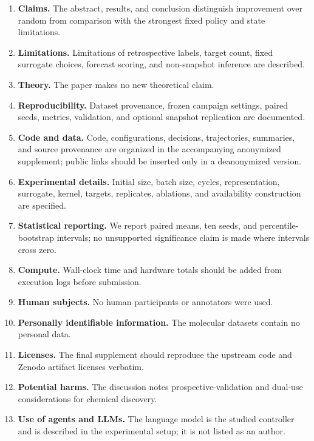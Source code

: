 \documentclass{article}
\begin{document}
\begin{enumerate}[leftmargin=*]
    \item \textbf{Claims.} \answerYes{} The abstract, results, and conclusion distinguish improvement over random from comparison with the strongest fixed policy and state limitations.
    \item \textbf{Limitations.} \answerYes{} Limitations of retrospective labels, target count, fixed surrogate choices, forecast scoring, and non-snapshot inference are described.
    \item \textbf{Theory.} \answerNA{} The paper makes no new theoretical claim.
    \item \textbf{Reproducibility.} \answerYes{} Dataset provenance, frozen campaign settings, paired seeds, metrics, validation, and optional snapshot replication are documented.
    \item \textbf{Code and data.} \answerYes{} Code, configurations, decisions, trajectories, summaries, and source provenance are organized in the accompanying anonymized supplement; public links should be inserted only in a deanonymized version.
    \item \textbf{Experimental details.} \answerYes{} Initial size, batch size, cycles, representation, surrogate, kernel, targets, replicates, ablations, and availability construction are specified.
    \item \textbf{Statistical reporting.} \answerYes{} We report paired means, ten seeds, and percentile-bootstrap intervals; no unsupported significance claim is made where intervals cross zero.
    \item \textbf{Compute.} \answerTODO{} Wall-clock time and hardware totals should be added from execution logs before submission.
    \item \textbf{Human subjects.} \answerNA{} No human participants or annotators were used.
    \item \textbf{Personally identifiable information.} \answerNA{} The molecular datasets contain no personal data.
    \item \textbf{Licenses.} \answerTODO{} The final supplement should reproduce the upstream code and Zenodo artifact licenses verbatim.
    \item \textbf{Potential harms.} \answerYes{} The discussion notes prospective-validation and dual-use considerations for chemical discovery.
    \item \textbf{Use of agents and LLMs.} \answerYes{} The language model is the studied controller and is described in the experimental setup; it is not listed as an author.
\end{enumerate}
\end{document}
